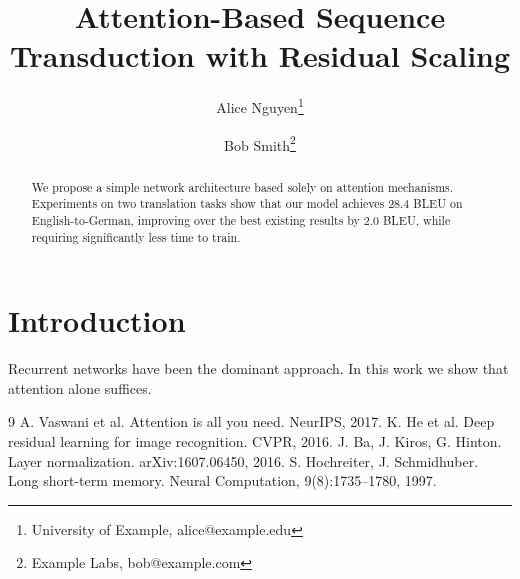\documentclass[10pt,twocolumn]{article}
\title{Attention-Based Sequence Transduction with Residual Scaling}
\author{Alice Nguyen\thanks{University of Example, alice@example.edu} \and Bob Smith\thanks{Example Labs, bob@example.com}}
\begin{document}
\maketitle
\begin{abstract}We propose a simple network architecture based solely on attention mechanisms. Experiments on two translation tasks show that our model achieves 28.4 BLEU on English-to-German, improving over the best existing results by 2.0 BLEU, while requiring significantly less time to train.\end{abstract}
\section{Introduction}Recurrent networks \cite{hochreiter1997} have been the dominant approach. In this work we show that attention alone suffices.




























\begin{thebibliography}{9}
 A. Vaswani et al. Attention is all you need. NeurIPS, 2017.
 K. He et al. Deep residual learning for image recognition. CVPR, 2016.
 J. Ba, J. Kiros, G. Hinton. Layer normalization. arXiv:1607.06450, 2016.
 S. Hochreiter, J. Schmidhuber. Long short-term memory. Neural Computation, 9(8):1735--1780, 1997.
\end{thebibliography}
\end{document}
